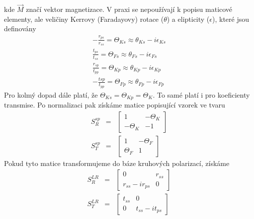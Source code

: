 kde $\vec{M}$ značí vektor magnetizace.
V praxi se nepoužívají k popisu maticové elementy, ale veličiny Kerrovy (Faradayovy) rotace ($\theta$)  a elipticity ($\epsilon$), které jsou definovány
\begin{eqnarray}
-\frac{r_{ps}}{r_{ss}}=\Theta_{Ks} \approx \theta_{Ks} -i\epsilon_{Ks} \\
\frac{t_{ps}}{t_{ss}}=\Theta_{Fs} \approx \theta_{Fs}-i\epsilon_{Fs} \\
\frac{r_{sp}}{t_{pp}} = \Theta_{Kp} \approx \theta_{Kp} -i\epsilon_{Kp}\\
-\frac{t{sp}}{t_{pp}} = \Theta_{Fp} \approx \theta_{Fp}-i\epsilon_{Fp}
\end{eqnarray}
Pro kolmý dopad dále platí, že $\Theta_{Ks}=\Theta_{Kp}=\Theta_K$. To samé platí i pro koeficienty transmise. Po normalizaci pak získáme matice popisující vzorek ve tvaru
\begin{eqnarray}
S_R^{sp}&=&\begin{bmatrix}1&-\Theta_K \\ -\Theta_K & -1 \end{bmatrix} \\
S_T^{sp}&=&\begin{bmatrix}1&-\Theta_F \\ \Theta_F& 1 \end{bmatrix}
\end{eqnarray}
Pokud tyto matice transformujeme do báze kruhových polarizací, získáme
\begin{eqnarray}
S_R^{LR}&=&\begin{bmatrix}0 & r_{ss}\\ r_{ss}-ir_{ps}&0\end{bmatrix} \\
S_T^{LR}&=&\begin{bmatrix}t_{ss} & 0 \\ 0& t_{ss}-it_{ps}\end{bmatrix}
\end{eqnarray}
